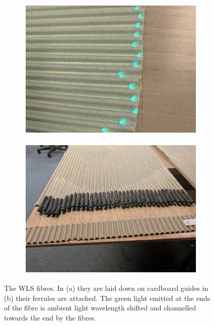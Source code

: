 \begin{figure}[!h]
\centering
\begin{subfigure}{.5\textwidth}
  \centering
  \includegraphics[width=\linewidth]{Chapter3/Figs/Raster/detCon013b_WlsFibres.png}
  \captionsetup{width=.9\linewidth}
  \caption{}
  \label{subFig:detCon013b_WlsFibres}
\end{subfigure}%
\begin{subfigure}{.5\textwidth}
  \centering
  \includegraphics[width=\linewidth]{Chapter3/Figs/Raster/detCon014b_WlsWithEnds.png}
  \captionsetup{width=.9\linewidth}
  \caption{}
  \label{subFig:detCon014b_WlsWithEnds}
\end{subfigure}
\caption{The WLS fibres. In (a) they are laid down on cardboard guides in (b) their ferrules are attached. The green light emitted at the ends of the fibre is ambient light wavelength shifted and channelled towards the end by the fibres.} %
\label{fig:detCon_WlsFibres_WlsWithEnds}
\end{figure}

